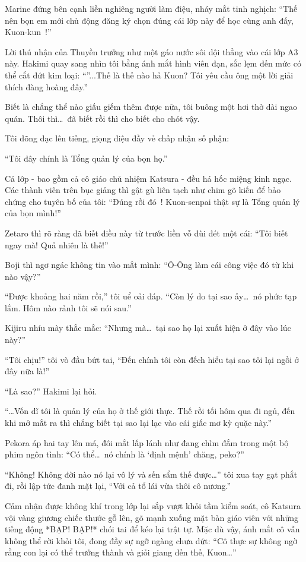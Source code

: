 \documentclass[../main.tex]{subfiles}
\begin{document}
Marine đứng bên cạnh liền nghiêng người làm điệu, nháy mắt tinh nghịch: ``Thế nên bọn em mới chủ động đăng ký chọn đúng cái lớp này để học cùng anh đấy, Kuon-kun~!''

Lời thú nhận của Thuyền trưởng như một gáo nước sôi dội thẳng vào cái lớp A3 này. Hakimi quay sang nhìn tôi bằng ánh mắt hình viên đạn, sắc lẹm đến mức có thể cắt đứt kim loại: ``''...Thế là thế nào hả Kuon? Tôi yêu cầu ông một lời giải thích đàng hoàng đấy.''

Biết là chẳng thể nào giấu giếm thêm được nữa, tôi buông một hơi thở dài ngao quán. Thôi thì\dots\ đã biết rồi thì cho biết cho chót vậy.

Tôi dõng dạc lên tiếng, giọng điệu đầy vẻ chấp nhận số phận:

``Tôi đây chính là Tổng quản lý của bọn họ.''

Cả lớp - bao gồm cả cô giáo chủ nhiệm Katsura - đều há hốc miệng kinh ngạc. Các thành viên trên bục giảng thì gật gù liên tạch như chim gõ kiến để bảo chứng cho tuyên bố của tôi: ``Đúng rồi đó~! Kuon-senpai thật sự là Tổng quản lý của bọn mình!''

Zetaro thì rõ ràng đã biết điều này từ trước liền vỗ đùi đét một cái: ``Tôi biết ngay mà! Quả nhiên là thế!''

Boji thì ngơ ngác không tin vào mắt mình: ``Ô-Ông làm cái công việc đó từ khi nào vậy?''

``Được khoảng hai năm rồi,'' tôi uể oải đáp. ``Còn lý do tại sao ấy\dots\ nó phức tạp lắm. Hôm nào rảnh tôi sẽ nói sau.''

Kijiru nhíu mày thắc mắc: ``Nhưng mà\dots\ tại sao họ lại xuất hiện ở đây vào lúc này?''

``Tôi chịu!'' tôi vò đầu bứt tai, ``Đến chính tôi còn đếch hiểu tại sao tôi lại ngồi ở đây nữa là!''

``Là sao?'' Hakimi lại hỏi.

``\dots Vốn dĩ tôi là quản lý của họ ở thế giới thực. Thế rồi tối hôm qua đi ngủ, đến khi mở mắt ra thì chẳng biết tại sao lại lạc vào cái giấc mơ kỳ quặc này.''

Pekora áp hai tay lên má, đôi mắt lấp lánh như đang chìm đắm trong một bộ phim ngôn tình: ``Có thể\dots\ nó chính là `định mệnh' chăng, peko?''

``Không! Không đời nào nó lại vô lý và sến sẩm thế được\dots'' tôi xua tay gạt phắt đi, rồi lập tức đanh mặt lại, ``Với cả tổ lái vừa thôi cô nương.''

Cảm nhận được không khí trong lớp lại sắp vượt khỏi tầm kiểm soát, cô Katsura vội vàng giương chiếc thước gỗ lên, gõ mạnh xuống mặt bàn giáo viên với những tiếng động *BẠP! BẠP!* chói tai để kéo lại trật tự. Mặc dù vậy, ánh mắt cô vẫn không thể rời khỏi tôi, đong đầy sự ngỡ ngàng chưa dứt: ``Cô thực sự không ngờ rằng con lại có thể trưởng thành và giỏi giang đến thế, Kuon\dots''
\end{document}
